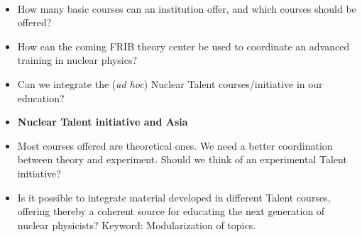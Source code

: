 \documentclass[%
twoside,                 %
final,                   %
10pt]{article}
\begin{document}
\paragraph{}
\begin{itemize}
\item How many basic courses can an institution offer, and which courses should be offered?

\item How can the coming FRIB theory center be used to coordinate an advanced training in nuclear physics?

\item Can we integrate the (\emph{ad hoc}) Nuclear Talent courses/initiative  in our education? 

\item \textbf{Nuclear Talent initiative and Asia} 

\item Most courses offered are theoretical ones. We need a better coordination between theory and experiment. Should we think of an experimental Talent initiative? 

\item Is it possible to integrate material developed in different Talent courses, offering thereby a coherent source for educating the next generation of nuclear physicists? Keyword: Modularization of topics.
\end{itemize}

\noindent










\printindex
\end{document}
